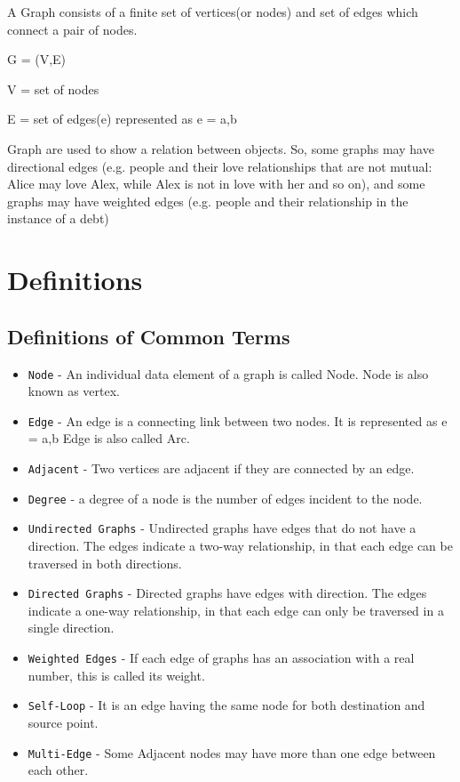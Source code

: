 \documentclass[12pt]{article}
\begin{document}
A Graph consists of a finite set of vertices(or nodes) and set of edges which connect a pair of nodes. 

G = (V,E)

V = set of nodes

E = set of edges(e) represented as e = {a,b}

Graph are used to show a relation between objects. So, some graphs may have directional edges (e.g. people and their love relationships that are not mutual: Alice may love Alex, while Alex is not in love with her and so on), and some graphs may have weighted edges (e.g. people and their relationship in the instance of a debt)

\section{Definitions}
    \subsection{Definitions of Common Terms}
        \begin{itemize}
          \item \texttt{Node} - An individual data element of a graph is called Node. Node is also known as vertex.
          \item \texttt{Edge} - An edge is a connecting link between two nodes. It is represented as e = {a,b} Edge is also called Arc. 
          \item \texttt{Adjacent} - Two vertices are adjacent if they are connected by an edge.
          \item \texttt{Degree} - a degree of a node is the number of edges incident to the node.  
          \item \texttt{Undirected Graphs} - Undirected graphs have edges that do not have a direction. The edges indicate a two-way relationship, in that each edge can be traversed in both directions.  
          \item \texttt{Directed Graphs} - Directed graphs have edges with direction. The edges indicate a one-way relationship, in that each edge can only be traversed in a single direction.  
          \item \texttt{Weighted Edges} - If each edge of graphs has an association with a real number, this is called its weight. 
          \item \texttt{Self-Loop} - It is an edge having the same node for both destination and source point.
          \item \texttt{Multi-Edge} - Some Adjacent nodes may have more than one edge between each other.
          
    
        \end{itemize}
        \newpage
\end{document}
